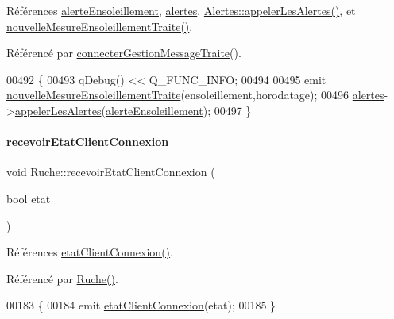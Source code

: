 Références \hyperlink{parametres_8h_a83a725fd153179a2bd97afcc8307737ba256a82c8886c1902dc7a078868434f83}{alerte\+Ensoleillement}, \hyperlink{class_ruche_af07644ddce44cb5ed4286475dc0f9d46}{alertes}, \hyperlink{class_alertes_ad04a02dcc6e6f14da0784c7054888b05}{Alertes\+::appeler\+Les\+Alertes()}, et \hyperlink{class_ruche_ac0cf9ceae0a82739dbb4c2d33c4a2494}{nouvelle\+Mesure\+Ensoleillement\+Traite()}.



Référencé par \hyperlink{class_ruche_a20ec8c6dc931218e5cf682050fe845d9}{connecter\+Gestion\+Message\+Traite()}.


\begin{DoxyCode}
00492 \{
00493     qDebug() << Q\_FUNC\_INFO;
00494 
00495     emit \hyperlink{class_ruche_ac0cf9ceae0a82739dbb4c2d33c4a2494}{nouvelleMesureEnsoleillementTraite}(ensoleillement,horodatage);
00496     \hyperlink{class_ruche_af07644ddce44cb5ed4286475dc0f9d46}{alertes}->\hyperlink{class_alertes_ad04a02dcc6e6f14da0784c7054888b05}{appelerLesAlertes}(\hyperlink{parametres_8h_a83a725fd153179a2bd97afcc8307737ba256a82c8886c1902dc7a078868434f83}{alerteEnsoleillement});
00497 \}
\end{DoxyCode}
\mbox{\label{class_ruche_a1224416341dc2b33418dd296327ae410}} 
\paragraph{\texorpdfstring{recevoir\+Etat\+Client\+Connexion}{recevoirEtatClientConnexion}}
{\footnotesize\ttfamily void Ruche\+::recevoir\+Etat\+Client\+Connexion (\begin{DoxyParamCaption}\item[{bool}]{etat }\end{DoxyParamCaption})\hspace{0.3cm}{\ttfamily [slot]}}



Références \hyperlink{class_ruche_a932b2c69dbe919afed9549d5666b2736}{etat\+Client\+Connexion()}.



Référencé par \hyperlink{class_ruche_a8b4ee3752d984c5acee93b990db7939a}{Ruche()}.


\begin{DoxyCode}
00183 \{
00184     emit \hyperlink{class_ruche_a932b2c69dbe919afed9549d5666b2736}{etatClientConnexion}(etat);
00185 \}
\end{DoxyCode}
\mbox{\label{class_ruche_a05a34e78d360609f772b9a37c69d0043}} 
